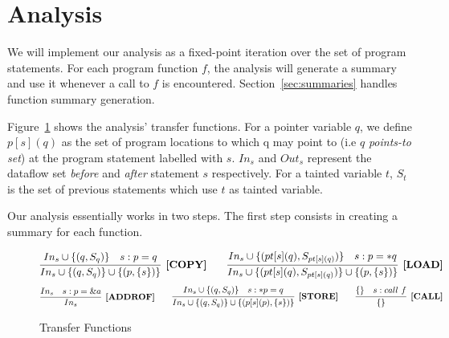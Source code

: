 \section{Analysis}\label{analysis}

We will implement our analysis as a fixed-point iteration
over the set of program statements. For each program function $f$,
the analysis will generate a summary and use it whenever
a call to $f$ is encountered.
Section~\ref{sec:summaries} handles function summary generation.

Figure~\ref{fig:rules} shows the analysis' transfer functions.
For a pointer variable $q$, we define \(p[s](q)\) as the set
of program locations to which q may point to (i.e $q$ \textit{points-to set})
at the program statement labelled with $s$.
$In_s$ and $Out_s$ represent the dataflow set \textit{before}
and \textit{after} statement $s$ respectively. 
For a tainted variable $t$, $S_t$ is the set of previous
statements which use $t$ as tainted variable.

\begin{comment}
\begin{table}[h!]
\begin{center}
\begin{tabular}{c|l}
Symbols & Description 	\\ \hline
\(In_s \)			& Dataflow set before statement $s$		\\	\hline
\(Out_s \)			& Dataflow set after statement $s$		\\  \hline
\(S_v \)			& Set of statements that use tainted variable $v$		\\
\end{tabular}
\caption{Symbol Description}
\end{center}
\end{table}
\end{comment}

Our analysis essentially works in two steps. The
first step consists in creating a summary for each
function.

\begin{figure}[!h]
\[
\infer[\COPY]
  {In_s \cup \set{(q, S_q)} \cup \set{(p, \set{s})}}
  {In_s \cup \set{(q, S_q)} & s:p = q}
\qquad
\infer[\LOAD]
  {In_s \cup \set{(pt[s](q), S_{pt[s](q)})} \cup \set{(p, \set{s})}}
  {In_s \cup \set{(pt[s](q), S_{pt[s](q)})}   & s:p = *q}
\]
\[
\infer[\ADDROF]
  {In_s }
  {In_s & s:p = \&a}
\qquad  
\infer[\STORE]
  {In_s \cup \set{(q, S_q)} \cup \set{(p[s](p), \set{s})} }
  {In_s \cup \set{(q, S_q)} & s:*p = q}
\qquad
\infer[\CALL]
  {\set{}}
  {\set{} & s:call\ f}  
\]
\caption{Transfer Functions}
\label{fig:rules}
\end{figure}

